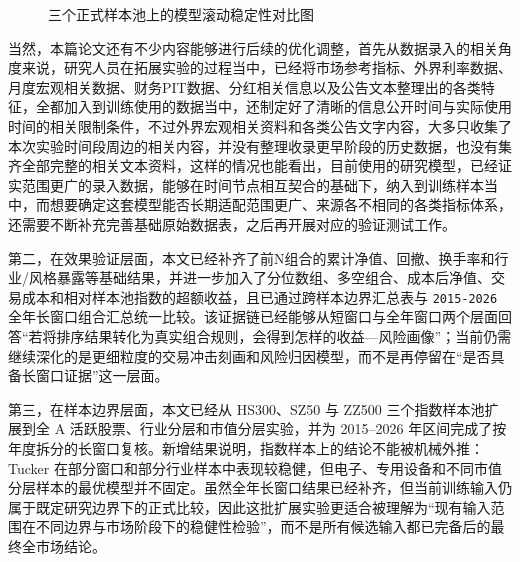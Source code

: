 \begin{figure}[htbp]
\centering
{}
\caption{三个正式样本池上的模型滚动稳定性对比图}
\label{fig:stability}
\end{figure}

当然，本篇论文还有不少内容能够进行后续的优化调整，首先从数据录入的相关角度来说，研究人员在拓展实验的过程当中，已经将市场参考指标、外界利率数据、月度宏观相关数据、财务PIT数据、分红相关信息以及公告文本整理出的各类特征，全都加入到训练使用的数据当中，还制定好了清晰的信息公开时间与实际使用时间的相关限制条件，不过外界宏观相关资料和各类公告文字内容，大多只收集了本次实验时间段周边的相关内容，并没有整理收录更早阶段的历史数据，也没有集齐全部完整的相关文本资料，这样的情况也能看出，目前使用的研究模型，已经证实范围更广的录入数据，能够在时间节点相互契合的基础下，纳入到训练样本当中，而想要确定这套模型能否长期适配范围更广、来源各不相同的各类指标体系，还需要不断补充完善基础原始数据表，之后再开展对应的验证测试工作。

第二，在效果验证层面，本文已经补齐了前N组合的累计净值、回撤、换手率和行业/风格暴露等基础结果，并进一步加入了分位数组、多空组合、成本后净值、交易成本和相对样本池指数的超额收益，且已通过跨样本边界汇总表与 \texttt{2015-2026} 全年长窗口组合汇总统一比较。该证据链已经能够从短窗口与全年窗口两个层面回答“若将排序结果转化为真实组合规则，会得到怎样的收益—风险画像”；当前仍需继续深化的是更细粒度的交易冲击刻画和风险归因模型，而不是再停留在“是否具备长窗口证据”这一层面。

第三，在样本边界层面，本文已经从 HS300、SZ50 与 ZZ500 三个指数样本池扩展到全 A 活跃股票、行业分层和市值分层实验，并为 2015--2026 年区间完成了按年度拆分的长窗口复核。新增结果说明，指数样本上的结论不能被机械外推：Tucker 在部分窗口和部分行业样本中表现较稳健，但电子、专用设备和不同市值分层样本的最优模型并不固定。虽然全年长窗口结果已经补齐，但当前训练输入仍属于既定研究边界下的正式比较，因此这批扩展实验更适合被理解为“现有输入范围在不同边界与市场阶段下的稳健性检验”，而不是所有候选输入都已完备后的最终全市场结论。

